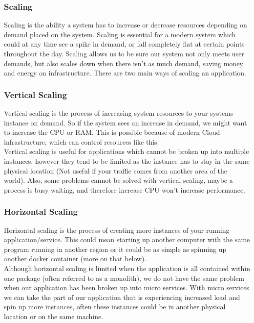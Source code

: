 \documentclass[titlepage]{article}
\begin{document}
\subsubsection{Scaling}
Scaling is the ability a system has to increase or decrease resources depending on demand placed on the system. Scaling is essential for a modern system which could at any time see a spike in demand, or fall completely flat at certain points throughout the day. Scaling allows us to be sure our system not only meets user demands, but also scales down when there isn't as much demand, saving money and energy on infrastructure. There are two main ways of scaling an application.

\subsubsection{Vertical Scaling}
Vertical scaling is the process of increasing system resources to your systems instance on demand. So if the system sees an increase in demand, we might want to increase the CPU or RAM. This is possible because of modern Cloud infrastructure, which can control resources like this. \\

Vertical scaling is useful for applications which cannot be broken up into multiple instances, however they tend to be limited as the instance has to stay in the same physical location (Not useful if your traffic comes from another area of the world). Also, some problems cannot be solved with vertical scaling, maybe a process is busy waiting, and therefore increase CPU won't increase performance.

\subsubsection{Horizontal Scaling}
Horizontal scaling is the process of creating more instances of your running application/service. This could mean starting up another computer with the same program running in another region or it could be as simple as spinning up another docker container (more on that below). \\

Although horizontal scaling is limited when the application is all contained within one package (often referred to as a monolith), we do not have the same problem when our application has been broken up into micro services. With micro services we can take the part of our application that is experiencing increased load and spin up more instances, often these instances could be in another physical location or on the same machine. \\
\end{document}
